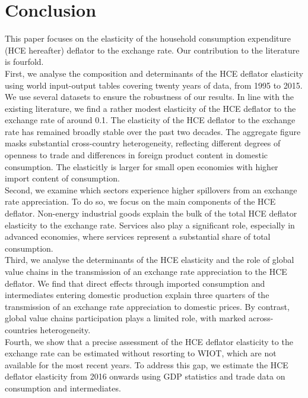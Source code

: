 \documentclass[12pt,a4paper]{paper}
\begin{document}
\section{Conclusion}
\label{sec:ccl}
This paper focuses on the elasticity of the household consumption expenditure (HCE hereafter) deflator to the exchange rate.
Our contribution to the literature is fourfold. \\
First, we analyse the composition and determinants of the HCE deflator elasticity using world input-output tables covering twenty years of data, from 1995 to 2015. 
We use several datasets to ensure the robustness of our results.
In line with the existing literature, we find a rather modest elasticity of the HCE deflator to the exchange rate of around 0.1.
The elasticity of the HCE deflator to the exchange rate has remained broadly stable over the past two decades.
The aggregate figure masks substantial cross-country heterogeneity, reflecting different degrees of openness to trade and differences in foreign product content in domestic consumption. 
The elasticitly is larger for small open economies with higher import content of consumption. \\
Second, we examine which sectors experience higher spillovers from an exchange rate appreciation. 
To do so, we focus on the main components of the HCE deflator. 
Non-energy industrial goods explain the bulk of the total HCE deflator elasticity to the exchange rate. 
Services also play a significant role, especially in advanced economies, where services represent a substantial share of total consumption. \\
Third, we analyse the determinants of the HCE elasticity and the role of global value chains in the transmission of an exchange rate appreciation to the HCE deflator.
We find that direct effects through imported consumption and intermediates entering domestic production explain three quarters of the transmission of an exchange rate appreciation to domestic prices.
By contrast, global value chains participation plays a limited role, with marked across-countries heterogeneity.\\
Fourth, we show that a precise assessment of the HCE deflator elasticity to the exchange rate can be estimated without resorting to WIOT, which are not available for the most recent years. 
To address this gap, we estimate the HCE deflator elasticity from 2016 onwards using GDP statistics and trade data on consumption and intermediates.
\end{document}
